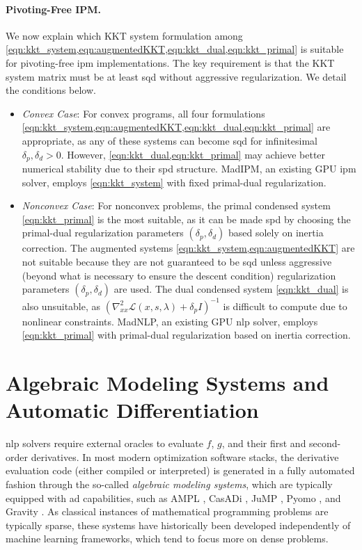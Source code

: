 \documentclass{article}
\begin{document}
\paragraph{Pivoting-Free IPM.}
We now explain which KKT system formulation among \cref{eqn:kkt_system,eqn:augmentedKKT,eqn:kkt_dual,eqn:kkt_primal} is suitable for pivoting-free \gls*{ipm} implementations. The key requirement is that the KKT system matrix must be at least \gls*{sqd} without aggressive regularization. We detail the conditions below.
\begin{itemize}[leftmargin=*,itemsep=0pt,parsep=0pt,partopsep=0pt]
\item \textit{Convex Case}:
  For convex programs, all four formulations \cref{eqn:kkt_system,eqn:augmentedKKT,eqn:kkt_dual,eqn:kkt_primal} are appropriate, as any of these systems can become \gls*{sqd} for infinitesimal $\delta_p, \delta_d > 0$. However, \cref{eqn:kkt_dual,eqn:kkt_primal} may achieve better numerical stability due to their \gls*{spd} structure. MadIPM, an existing GPU \gls*{ipm} solver, employs \cref{eqn:kkt_system} with fixed primal-dual regularization.
\item \textit{Nonconvex Case}:
  For nonconvex problems, the primal condensed system \cref{eqn:kkt_primal} is the most suitable, as it can be made \gls*{spd} by choosing the primal-dual regularization parameters $(\delta_p, \delta_d)$ based solely on inertia correction. The augmented systems \cref{eqn:kkt_system,eqn:augmentedKKT} are not suitable because they are not guaranteed to be \gls*{sqd} unless aggressive (beyond what is necessary to ensure the descent condition) regularization parameters $(\delta_p, \delta_d)$ are used. The dual condensed system \cref{eqn:kkt_dual} is also unsuitable, as $(\nabla^2_{x x} \mathcal{L}(x,s,\lambda) + \delta_p I)^{-1}$ is difficult to compute due to nonlinear constraints. MadNLP, an existing GPU \gls*{nlp} solver, employs \cref{eqn:kkt_primal} with primal-dual regularization based on inertia correction.
\end{itemize}




\section{Algebraic Modeling Systems and Automatic Differentiation}\label{eqn:ad}
\Gls*{nlp} solvers require external oracles to evaluate $f$, $g$, and their first and second-order derivatives. In most modern optimization software stacks, the derivative evaluation code (either compiled or interpreted) is generated in a fully automated fashion through the so-called \emph{algebraic modeling systems}, which are typically equipped with \gls*{ad} capabilities, such as AMPL \cite{fourerModelingLanguageMathematical1990}, CasADi \cite{anderssonCasADiSoftwareFramework2019}, JuMP \cite{dunningJuMPModelingLanguage2017}, Pyomo \cite{hartPyomoModelingSolving2011}, and Gravity \cite{hijaziGravityMathematicalModeling2018}. As classical instances of mathematical programming problems are typically sparse, these systems have historically been developed independently of machine learning frameworks, which tend to focus more on dense problems.
\end{document}
